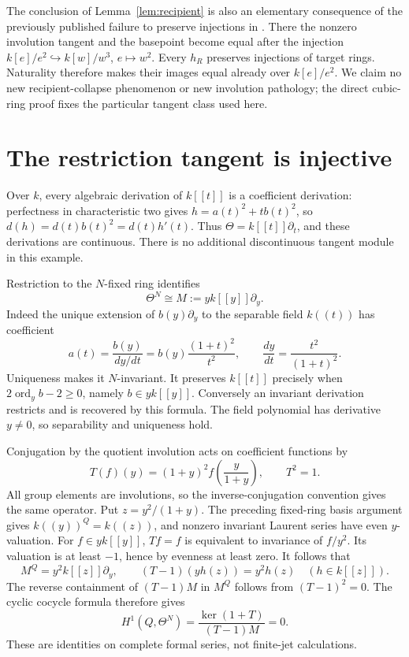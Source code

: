 \documentclass[11pt]{article}
\newcommand{\Th}{\Theta}
\begin{document}
The conclusion of Lemma~\ref{lem:recipient} is also an elementary consequence
of the previously published failure to preserve injections in
\cite[Proposition~6.1, p.~899]{BC}. There the nonzero involution tangent and
the basepoint become equal after the injection
$k[e]/e^2\hookrightarrow k[w]/w^3$, $e\mapsto w^2$.
Every $h_R$ preserves injections of target rings. Naturality therefore makes
their images equal already over $k[e]/e^2$. We claim no new recipient-collapse
phenomenon or new involution pathology; the direct cubic-ring proof fixes
the particular tangent class used here.

\section{The restriction tangent is injective}
Over $k$, every algebraic derivation of $k[[t]]$ is a coefficient derivation:
perfectness in characteristic two gives $h=a(t)^2+tb(t)^2$, so
$d(h)=d(t)b(t)^2=d(t)h'(t)$. Thus $\Th=k[[t]]\partial_t$, and these
derivations are continuous. There is no additional discontinuous tangent
module in this example.

Restriction to the $N$-fixed ring identifies
\[
 \Th^N\cong M:=yk[[y]]\partial_y.
\]
Indeed the unique extension of $b(y)\partial_y$ to the separable field
$k((t))$ has coefficient
\[
 a(t)=\frac{b(y)}{dy/dt}=b(y)\frac{(1+t)^2}{t^2},
 \qquad \frac{dy}{dt}=\frac{t^2}{(1+t)^2}.
\]
Uniqueness makes it $N$-invariant. It preserves $k[[t]]$ precisely when
$2\operatorname{ord}_y b-2\geq0$, namely $b\in yk[[y]]$.
Conversely an invariant derivation restricts and is recovered by this
formula. The field polynomial has derivative $y\ne0$, so separability
and uniqueness hold.

Conjugation by the quotient involution acts on coefficient functions by
\[
 T(f)(y)=(1+y)^2f\!\left(\frac{y}{1+y}\right),\qquad T^2=1.
\]
All group elements are involutions, so the inverse-conjugation convention
gives the same operator. Put $z=y^2/(1+y)$. The preceding fixed-ring basis
argument gives $k((y))^Q=k((z))$, and nonzero invariant Laurent series have
even $y$-valuation. For $f\in yk[[y]]$, $Tf=f$ is equivalent to invariance
of $f/y^2$. Its valuation is at least $-1$, hence by evenness at least zero.
It follows that
\[
 M^Q=y^2k[[z]]\partial_y,
 \qquad (T-1)(y h(z))=y^2h(z)\quad(h\in k[[z]]).
\]
The reverse containment of $(T-1)M$ in $M^Q$ follows from $(T-1)^2=0$.
The cyclic cocycle formula therefore gives
\[
 H^1(Q,\Th^N)=\frac{\ker(1+T)}{(T-1)M}=0.
\]
These are identities on complete formal series, not finite-jet calculations.
\end{document}

